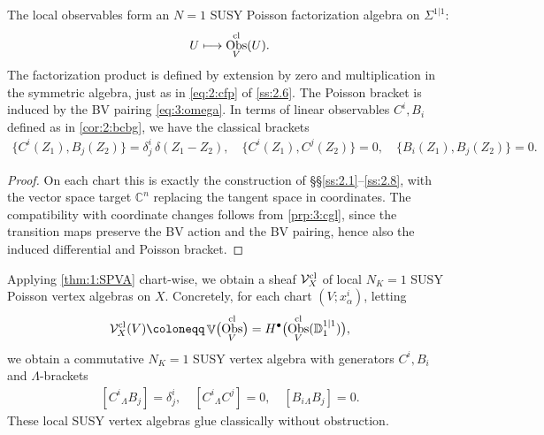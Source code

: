 \documentclass[final,reqno]{amsart}
\numberwithin{equation}{section}
\theoremstyle{definition}
\newtheorem{prp}[thm]{Proposition}
\newcommand{\bl}{\bullet}
\newcommand{\ceq}{\coloneqq} %
\newcommand{\lmto}{\longmapsto}
\newcommand{\tcl}{\textup{cl}}
\newcommand{\bbC}{\mathbb{C}}
\newcommand{\sD}{\mathbb{D}^{1|1}}
\newcommand{\clV}{\mathcal{V}}
\newcommand{\sSig}{\Sigma^{1|1}}
\newcommand{\cObs}[1]{\mathop{\Obs^{\textup{cl}}_{#1}}}
\newcommand{\scObs}[1]{\mathop{\EuScript{O}bs^{\tcl}_{#1}}}
\DeclareMathOperator{\bbV}{\mathbb{V}}
\DeclareMathOperator{\Obs}{Obs}
\begin{document}
The local observables form 
an $N=1$ SUSY Poisson factorization algebra on $\sSig$:
\begin{align}\label{eq:3:lsFA}
 U \lmto \cObs{V}(U).
\end{align}
The factorization product is defined by extension by zero and multiplication
in the symmetric algebra, just as in \eqref{eq:2:cfp} of \cref{ss:2.6}. 
The Poisson bracket is induced by the BV pairing \eqref{eq:3:omega}. 
In terms of linear observables $C^i,B_i$ defined as in \cref{cor:2:bcbg}, 
we have the classical brackets
\begin{align*}
 \{C^i(Z_1),B_j(Z_2)\} = \delta^i_j\,\delta(Z_1-Z_2), \quad
 \{C^i(Z_1),C^j(Z_2)\} = 0, \quad
 \{B_i(Z_1),B_j(Z_2)\} = 0.
\end{align*}


\begin{proof}
On each chart this is exactly the construction of 
\S\S \ref{ss:2.1}--\ref{ss:2.8}, with the vector space target $\bbC^n$ 
replacing the tangent space in coordinates.
The compatibility with coordinate changes follows from \cref{prp:3:cgl},
since the transition maps preserve the BV action and the BV pairing, 
hence also the induced differential and Poisson bracket.
\end{proof}

Applying \cref{thm:1:SPVA} chart-wise, we obtain a sheaf $\clV^{\tcl}_X$
of local $N_K=1$ SUSY Poisson vertex algebras on $X$. 
Concretely, for each chart $(V;x^i_\alpha)$, letting
\[
 \clV^{\tcl}_X(V) \ceq \bbV\bigl(\cObs{V}\bigr) 
                  = H^{\bl}\bigl(\cObs{V}(\sD_1)\bigr),
\]
we obtain a commutative $N_K=1$ SUSY vertex algebra 
with generators $C^i,B_i$ and $\Lambda$-brackets
\begin{align}\label{eq:3.3-classical-lambda}
 [C^i{}_{\Lambda}B_j] = \delta^i_j, \quad
 [C^i{}_{\Lambda}C^j] = 0, \quad
 [B_i{}_{\Lambda}B_j] = 0.
\end{align}
These local SUSY vertex algebras glue classically without obstruction.
\end{document}

